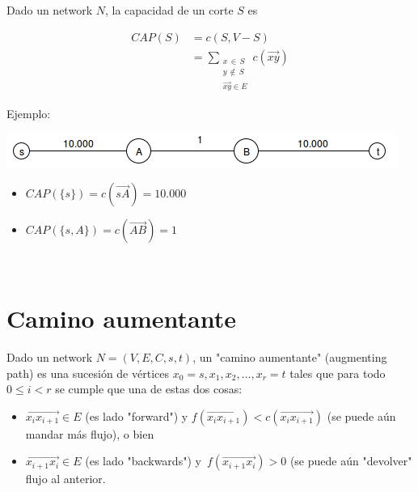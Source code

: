 \documentclass[10pt,a4paper]{article}
\begin{document}
Dado un network $N$, la capacidad de un corte $S$ es

\begin{center}
\begin{align*} CAP(S) &= c(S, V-S)\\ &= \sum\limits_{\substack{x\,\in\,S \\ y \,\not \in\,S\\ \overrightarrow{xy}\in E }} c(\overrightarrow{xy} ) \end{align*} 
\end{center}

Ejemplo:

\begin{center}

    \begin{adjustbox}{max size={\textwidth}{\textheight}}
        \includegraphics{definitions/cut.png}
        \end{adjustbox}
    
\end{center}

\begin{itemize}

	\item $CAP(\{s\}) = c(\overrightarrow{sA}) = 10.000$
	\item $CAP(\{s, A\}) = c(\overrightarrow{AB}) = 1$
\end{itemize}

 

\section*{Camino aumentante}

Dado un network $N = (V, E, C, s, t)$, un "camino aumentante" (augmenting path) es una sucesión de vértices $x_0 = s, x_1, x_2, \dots, x_r = t$ tales que para todo $0\leq i < r$ se cumple que una de estas dos cosas:

\begin{itemize}

	\item $\overrightarrow{x_ix_{i+1}} \in E$ (es lado "forward") y $f(\overrightarrow{x_ix_{i+1}}) < c(\overrightarrow{x_ix_{i+1}})$ (se puede aún mandar más flujo), o bien
	\item $\overrightarrow{x_{i+1}x_i} \in E$ (es lado "backwards") y $f(\overrightarrow{x_{i+1}x_i}) > 0$ (se puede aún "devolver" flujo al anterior.
\end{itemize}
\end{document}
